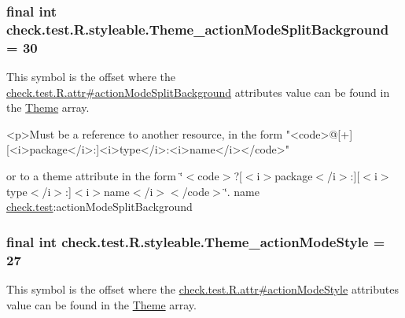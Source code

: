 \subsubsection[{Theme\+\_\+action\+Mode\+Split\+Background}]{\setlength{\rightskip}{0pt plus 5cm}final int check.\+test.\+R.\+styleable.\+Theme\+\_\+action\+Mode\+Split\+Background = 30\hspace{0.3cm}{\ttfamily [static]}}\label{classcheck_1_1test_1_1_r_1_1styleable_a8f38579426c6d3ff9440e1e2dce58bc6}
This symbol is the offset where the \hyperlink{classcheck_1_1test_1_1_r_1_1attr_ab54b0e4c2777d73f47b3f7d655ecc84e}{check.\+test.\+R.\+attr\#action\+Mode\+Split\+Background} attribute\textquotesingle{}s value can be found in the \hyperlink{classcheck_1_1test_1_1_r_1_1styleable_acca726d02016a0cf607782ec3a436a81}{Theme} array.

\begin{DoxyVerb}      <p>Must be a reference to another resource, in the form "<code>@[+][<i>package</i>:]<i>type</i>:<i>name</i></code>"
\end{DoxyVerb}
 or to a theme attribute in the form \char`\"{}$<$code$>$?\mbox{[}$<$i$>$package$<$/i$>$\+:\mbox{]}\mbox{[}$<$i$>$type$<$/i$>$\+:\mbox{]}$<$i$>$name$<$/i$>$$<$/code$>$\char`\"{}.  name \hyperlink{namespacecheck_1_1test}{check.\+test}\+:action\+Mode\+Split\+Background \hypertarget{classcheck_1_1test_1_1_r_1_1styleable_a21f32ef93d16b662bb12165a0ebee2be}{}
\subsubsection[{Theme\+\_\+action\+Mode\+Style}]{\setlength{\rightskip}{0pt plus 5cm}final int check.\+test.\+R.\+styleable.\+Theme\+\_\+action\+Mode\+Style = 27\hspace{0.3cm}{\ttfamily [static]}}\label{classcheck_1_1test_1_1_r_1_1styleable_a21f32ef93d16b662bb12165a0ebee2be}
This symbol is the offset where the \hyperlink{classcheck_1_1test_1_1_r_1_1attr_a5b076a6be691781155b6fd38363e01aa}{check.\+test.\+R.\+attr\#action\+Mode\+Style} attribute\textquotesingle{}s value can be found in the \hyperlink{classcheck_1_1test_1_1_r_1_1styleable_acca726d02016a0cf607782ec3a436a81}{Theme} array.

